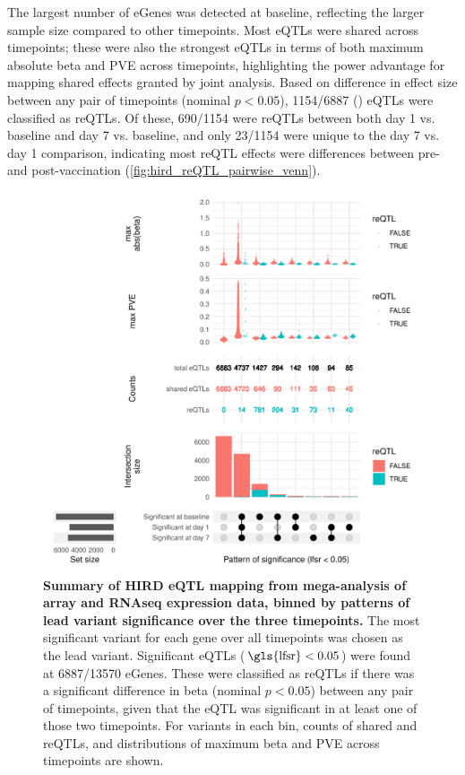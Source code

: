 The largest number of eGenes was detected at baseline, reflecting the larger sample size compared to other timepoints.
Most \glspl{eQTL} were shared across timepoints; 
these were also the strongest \glspl{eQTL} in terms of both maximum absolute beta and \gls{PVE} across timepoints, highlighting the power advantage for mapping shared effects granted by joint analysis.
Based on difference in effect size between any pair of timepoints (nominal $p < 0.05$),
\num{1154/6887} () \glspl{eQTL} were classified as \glspl{reQTL}.
Of these, 
\num{690/1154} were \glspl{reQTL} between both day 1 vs. baseline and day 7 vs. baseline, 
and only \num{23/1154} were unique to the day 7 vs. day 1 comparison, 
indicating most \gls{reQTL} effects were differences between pre- and post-vaccination (\cref{fig:hird_reQTL_pairwise_venn}).

\begin{figure}
    \centering
    \includegraphics[width=1.0\textwidth]{mainmatter/figures/chapter_03/compare_dge_eqtl.upset.pdf}
    \caption{
        \textbf{Summary of \gls{HIRD} \gls{eQTL} mapping from mega-analysis of array and \gls{RNAseq} expression data, binned by patterns of lead variant significance over the three timepoints.}
        The most significant variant for each gene over all timepoints was chosen as the lead variant.
        Significant \glspl{eQTL} ($\text{\gls{lfsr}} < 0.05$) were found at \num{6887/13570} eGenes.
        These were classified as \glspl{reQTL} if there was a significant difference in beta (nominal $p < 0.05$) between any pair of timepoints,
        given that the \gls{eQTL} was significant in at least one of those two timepoints.
        For variants in each bin, counts of shared and \glspl{reQTL}, and distributions of maximum beta and \gls{PVE} across timepoints are shown.
    }
    \label{fig:hird_reQTL_upset_mega}
\end{figure}

